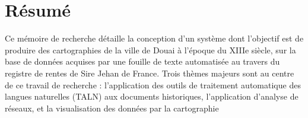 \chapter*{Résumé}
 Ce mémoire de recherche détaille la conception d’un système dont l’objectif est de produire des cartographies de la ville de Douai à l’époque du XIIIe siècle, sur la base de données acquises par une fouille de texte automatisée au travers du registre de rentes de Sire Jehan de France.
 Trois thèmes majeurs sont au centre de ce travail de recherche : l’application des outils de traitement automatique des langues naturelles (TALN) aux documents historiques, l'application d'analyse de réseaux, et la visualisation des données par la cartographie 


